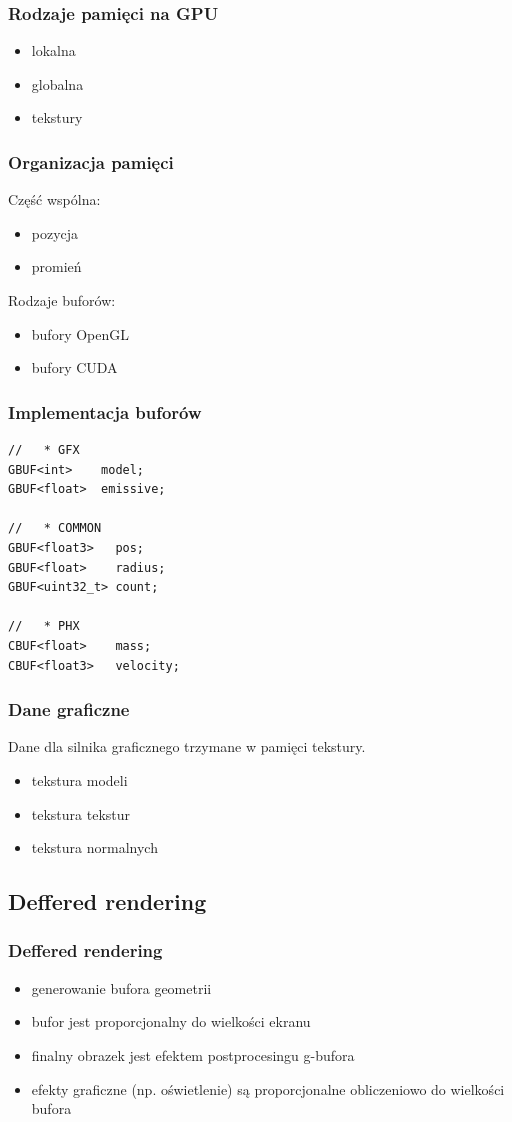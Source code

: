 \documentclass{beamer}
\begin{document}
\frame
{
	\frametitle{Rodzaje pamięci na GPU}

	\begin{itemize}
	\item lokalna
	\item globalna
	\item tekstury
	\end{itemize}
}

\frame
{
	\frametitle{Organizacja pamięci}

	Część wspólna:
	\begin{itemize}
	\item pozycja
	\item promień
	\end{itemize}

	\pause
	Rodzaje buforów:

	\begin{itemize}
	\item bufory OpenGL
	\item bufory CUDA
	\end{itemize}

}

\begin{frame}[fragile]
	\frametitle{Implementacja buforów}
	\begin{verbatim}
//   * GFX
GBUF<int>    model;
GBUF<float>  emissive;

//   * COMMON
GBUF<float3>   pos;
GBUF<float>    radius;
GBUF<uint32_t> count;

//   * PHX
CBUF<float>    mass;
CBUF<float3>   velocity;
	\end{verbatim}
\end{frame}

\frame
{
	\frametitle{Dane graficzne}

	Dane dla silnika graficznego trzymane w pamięci tekstury.
	\begin{itemize}
	\item tekstura modeli
	\item tekstura tekstur
	\item tekstura normalnych
	\end{itemize}
}

\subsection{Deffered rendering}\label{sub:deffered rendering}

\frame
{
	\frametitle{Deffered rendering}

	\begin{itemize}
	\item generowanie bufora geometrii
	\item bufor jest proporcjonalny do wielkości ekranu
	\item finalny obrazek jest efektem postprocesingu g-bufora
	\item efekty graficzne (np. oświetlenie) są proporcjonalne obliczeniowo do wielkości bufora
	\end{itemize}
}
\end{document}
